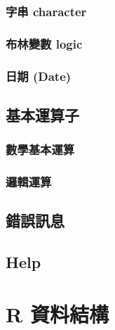 \documentclass[
]{book}
\begin{document}
\hypertarget{ux5b57ux4e32-character}{%
\subsection{字串 character}\label{ux5b57ux4e32-character}}

\hypertarget{ux5e03ux6797ux8b8aux6578-logic}{%
\subsection{布林變數 logic}\label{ux5e03ux6797ux8b8aux6578-logic}}

\hypertarget{ux65e5ux671f-date}{%
\subsection{日期 (Date)}\label{ux65e5ux671f-date}}

\hypertarget{ux57faux672cux904bux7b97ux5b50}{%
\section{基本運算子}\label{ux57faux672cux904bux7b97ux5b50}}

\hypertarget{ux6578ux5b78ux57faux672cux904bux7b97}{%
\subsection{數學基本運算}\label{ux6578ux5b78ux57faux672cux904bux7b97}}

\hypertarget{ux908fux8f2fux904bux7b97}{%
\subsection{邏輯運算}\label{ux908fux8f2fux904bux7b97}}

\hypertarget{ux932fux8aa4ux8a0aux606f}{%
\section{錯誤訊息}\label{ux932fux8aa4ux8a0aux606f}}

\hypertarget{help}{%
\section{Help}\label{help}}

\hypertarget{RDataStructure}{%
\chapter{R 資料結構}\label{RDataStructure}}
\end{document}
